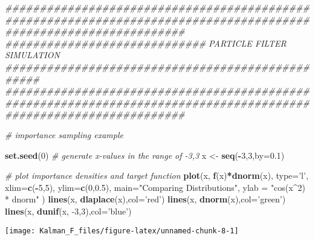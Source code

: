 \documentclass[
]{article}
\newenvironment{Shaded}{\begin{snugshade}}{\end{snugshade}}
\newcommand{\CommentTok}[1]{\textcolor[rgb]{0.56,0.35,0.01}{\textit{#1}}}
\newcommand{\DataTypeTok}[1]{\textcolor[rgb]{0.13,0.29,0.53}{#1}}
\newcommand{\DecValTok}[1]{\textcolor[rgb]{0.00,0.00,0.81}{#1}}
\newcommand{\FloatTok}[1]{\textcolor[rgb]{0.00,0.00,0.81}{#1}}
\newcommand{\KeywordTok}[1]{\textcolor[rgb]{0.13,0.29,0.53}{\textbf{#1}}}
\newcommand{\NormalTok}[1]{#1}
\newcommand{\OperatorTok}[1]{\textcolor[rgb]{0.81,0.36,0.00}{\textbf{#1}}}
\newcommand{\StringTok}[1]{\textcolor[rgb]{0.31,0.60,0.02}{#1}}
\begin{document}
\begin{Shaded}
\begin{Highlighting}[]
\CommentTok{##################################################################################################################}
\CommentTok{#############################     PARTICLE FILTER SIMULATION     #################################################}
\CommentTok{##################################################################################################################}

\CommentTok{# importance sampling example}

\KeywordTok{set.seed}\NormalTok{(}\DecValTok{0}\NormalTok{)}
\CommentTok{# generate x-values in the range of -3,3}
\NormalTok{x <-}\StringTok{ }\KeywordTok{seq}\NormalTok{(}\OperatorTok{-}\DecValTok{3}\NormalTok{,}\DecValTok{3}\NormalTok{,}\DataTypeTok{by=}\FloatTok{0.1}\NormalTok{)}

\CommentTok{# plot importance densities and target function}
\KeywordTok{plot}\NormalTok{(x, }\KeywordTok{f}\NormalTok{(x)}\OperatorTok{*}\KeywordTok{dnorm}\NormalTok{(x), }\DataTypeTok{type=}\StringTok{'l'}\NormalTok{, }\DataTypeTok{xlim=}\KeywordTok{c}\NormalTok{(}\OperatorTok{-}\DecValTok{5}\NormalTok{,}\DecValTok{5}\NormalTok{), }\DataTypeTok{ylim=}\KeywordTok{c}\NormalTok{(}\DecValTok{0}\NormalTok{,}\FloatTok{0.5}\NormalTok{), }
    \DataTypeTok{main=}\StringTok{"Comparing Distributions"}\NormalTok{,}
    \DataTypeTok{ylab =} \StringTok{"cos(x^2) * dnorm"}
\NormalTok{)}
\KeywordTok{lines}\NormalTok{(x, }\KeywordTok{dlaplace}\NormalTok{(x),}\DataTypeTok{col=}\StringTok{'red'}\NormalTok{)}
\KeywordTok{lines}\NormalTok{(x, }\KeywordTok{dnorm}\NormalTok{(x),}\DataTypeTok{col=}\StringTok{'green'}\NormalTok{)}
\KeywordTok{lines}\NormalTok{(x, }\KeywordTok{dunif}\NormalTok{(x, }\DecValTok{-3}\NormalTok{,}\DecValTok{3}\NormalTok{),}\DataTypeTok{col=}\StringTok{'blue'}\NormalTok{)}
\end{Highlighting}
\end{Shaded}

\begin{center}\texttt{[image: Kalman\_F\_files/figure-latex/unnamed-chunk-8-1]} \end{center}
\end{document}
